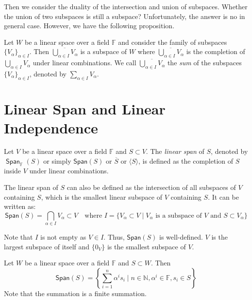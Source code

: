 \documentclass[
	11pt, %
	fleqn, %
	a4paper, %
]{LegrandOrangeBook}
\renewcommand{\span}[1]{\mathsf{Span}(#1)} %
\renewcommand{\bar}[1]{\overline{#1}} %
\newcommand{\F}{\mathbb{F}} %
\DeclareMathOperator{\Span}{\mathsf{Span}}
\begin{document}
Then we consider the duality of the intersection and union of subspaces. Whether the union of two subspaces is still a subspace? Unfortunately, the answer is no in general case. However, we have the following proposition.

\begin{proposition}
    Let $W$ be a linear space over a field $\F$ and consider the family of subspaces $\{V_\alpha\}_{\alpha \in I}$. Then $\bar{\bigcup_{\alpha \in I} V_\alpha}$ is a subspace of $W$ where $\bar{\bigcup_{\alpha \in I} V_\alpha}$ is the completion of $\bigcup_{\alpha \in I} V_\alpha$ under linear combinations. We call $\bar{\bigcup_{\alpha \in I} V_\alpha}$ the \emph{sum} of the subspaces $\{V_\alpha\}_{\alpha \in I}$, denoted by $\sum_{\alpha \in I} V_\alpha$.
\end{proposition}

\newpage

\section{Linear Span and Linear Independence}

\begin{definition}
    Let $V$ be a linear space over a field $\F$ and $S \subset V$. The \emph{linear span} of $S$, denoted by $\Span_\F (S)$ or simply $\span S$ or $\bar{S}$ or $\langle S \rangle$, is defined as the completion of $S$ inside $V$ under linear combinations.
\end{definition}

\begin{corollary}
    The linear span of $S$ can also be defined as the intersection of all subspaces of $V$ containing $S$, which is the smallest linear subspace of $V$ containing $S$. It can be written as:
    \[
        \span S = \bigcap_{\alpha \in I} V_{\alpha} \subset V \quad \text{where } I = \{ V_{\alpha} \subset V \mid V_{\alpha} \text{ is a subspace of } V \text{ and } S \subset V_{\alpha} \}
    \]
\end{corollary}
\begin{remark}
    Note that $I$ is not empty as $V \in I$. Thus, $\span S$ is well-defined. $V$ is the largest subspace of itself and $\{0_V\}$ is the smallest subspace of $V$.
\end{remark}

\begin{proposition}
    Let $W$ be a linear space over a field $\F$ and $S \subset W$. Then 
    \[
        \span S = \left\{ \sum_{i=1}^{n} \alpha^i s_i \mid n \in \mathbb{N}, \alpha^i \in \F, s_i \in S \right\}
    \]
    Note that the summation is a finite summation.
\end{proposition}
\end{document}

